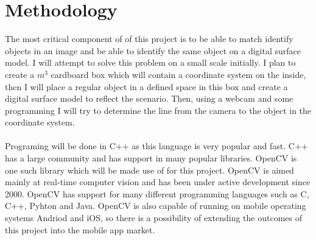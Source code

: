 \section{Methodology}

The most critical component of of this project is to be able to match identify objects in an image and be able to identify the same object on a digital surface model. I will attempt to solve this problem on a small scale initially. I plan to create a $m^3$ cardboard box which will contain a coordinate system on the inside, then I will place a regular object in a defined space in this box and create a digital surface model to reflect the scenario. Then, using a webcam and some programming I will try to determine the line from the camera to the object in the coordinate system.

\paragraph{}
Programing will be done in C++ as this language is very popular and fast. C++ has a large community and has support in many popular libraries. OpenCV is one such library which will be made use of for this project. OpenCV is aimed mainly at real-time computer vision and has been under active development since 2000. OpenCV has support for many different programming languages such as C, C++, Pyhton and Java. OpenCV is also capable of running on mobile operating systems Andriod and iOS, so there is a possibility of extending the outcomes of this project into the mobile app market.
